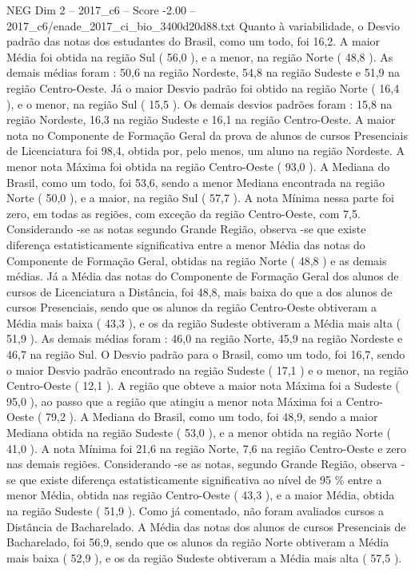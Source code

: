 \begin{textsample}{NEG Dim 2 – 2017\_c6 – Score -2.00 – 2017\_c6/enade\_2017\_ci\_bio\_3400d20d88.txt}
Quanto à variabilidade, o Desvio padrão das notas dos estudantes do Brasil, como um todo, foi 16,2.
A maior Média foi obtida na região Sul ( 56,0 ), e a menor, na região Norte ( 48,8 ).
As demais médias foram : 50,6 na região Nordeste, 54,8 na região Sudeste e 51,9 na região Centro-Oeste.
Já o maior Desvio padrão foi obtido na região Norte ( 16,4 ), e o menor, na região Sul ( 15,5 ).
Os demais desvios padrões foram : 15,8 na região Nordeste, 16,3 na região Sudeste e 16,1 na região Centro-Oeste.
A maior nota no Componente de Formação Geral da prova de alunos de cursos Presenciais de Licenciatura foi 98,4, obtida por, pelo menos, um aluno na região Nordeste.
A menor nota Máxima foi obtida na região Centro-Oeste ( 93,0 ).
A Mediana do Brasil, como um todo, foi 53,6, sendo a menor Mediana encontrada na região Norte ( 50,0 ), e a maior, na região Sul ( 57,7 ).
A nota Mínima nessa parte foi zero, em todas as regiões, com exceção da região Centro-Oeste, com 7,5.
Considerando -se as notas segundo Grande Região, observa -se que existe diferença estatisticamente significativa entre a menor Média das notas do Componente de Formação Geral, obtidas na região Norte ( 48,8 ) e as demais médias.
Já a Média das notas do Componente de Formação Geral dos alunos de cursos de Licenciatura a Distância, foi 48,8, mais baixa do que a dos alunos de cursos Presenciais, sendo que os alunos da região Centro-Oeste obtiveram a Média mais baixa ( 43,3 ), e os da região Sudeste obtiveram a Média mais alta ( 51,9 ).
As demais médias foram : 46,0 na região Norte, 45,9 na região Nordeste e 46,7 na região Sul.
O Desvio padrão para o Brasil, como um todo, foi 16,7, sendo o maior Desvio padrão encontrado na região Sudeste ( 17,1 ) e o menor, na região Centro-Oeste ( 12,1 ).
A região que obteve a maior nota Máxima foi a Sudeste ( 95,0 ), ao passo que a região que atingiu a menor nota Máxima foi a Centro-Oeste ( 79,2 ).
A Mediana do Brasil, como um todo, foi 48,9, sendo a maior Mediana obtida na região Sudeste ( 53,0 ), e a menor obtida na região Norte ( 41,0 ).
A nota Mínima foi 21,6 na região Norte, 7,6 na região Centro-Oeste e zero nas demais regiões.
Considerando -se as notas, segundo Grande Região, observa -se que existe diferença estatisticamente significativa ao nível de 95 \% entre a menor Média, obtida nas região Centro-Oeste ( 43,3 ), e a maior Média, obtida na região Sudeste ( 51,9 ).
Como já comentado, não foram avaliados cursos a Distância de Bacharelado.
A Média das notas dos alunos de cursos Presenciais de Bacharelado, foi 56,9, sendo que os alunos da região Norte obtiveram a Média mais baixa ( 52,9 ), e os da região Sudeste obtiveram a Média mais alta ( 57,5 ).

\end{textsample}
